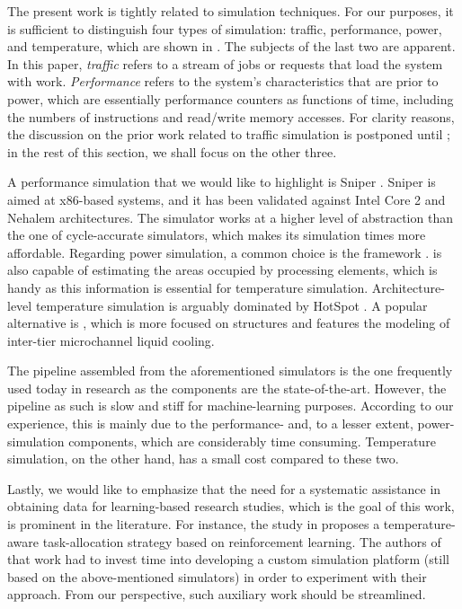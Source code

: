 The present work is tightly related to simulation techniques. For our purposes,
it is sufficient to distinguish four types of simulation: traffic, performance,
power, and temperature, which are shown in . The subjects of
the last two are apparent. In this paper, \emph{traffic} refers to a stream of
jobs or requests that load the system with work. \emph{Performance} refers to
the system's characteristics that are prior to power, which are essentially
performance counters as functions of time, including the numbers of instructions
and read/write memory accesses. For clarity reasons, the discussion on the prior
work related to traffic simulation is postponed until ; in the
rest of this section, we shall focus on the other three.

A performance simulation that we would like to highlight is Sniper
\cite{carlson2011}. Sniper is aimed at x86-based systems, and it has been
validated against Intel Core 2 and Nehalem architectures. The simulator works at
a higher level of abstraction than the one of cycle-accurate simulators, which
makes its simulation times more affordable. Regarding power simulation, a common
choice is the  framework \cite{li2009}.  is also capable of
estimating the areas occupied by processing elements, which is handy as this
information is essential for temperature simulation. Architecture-level
temperature simulation is arguably dominated by HotSpot \cite{skadron2004}. A
popular alternative is  \cite{sridhar2010}, which is more focused on
 structures and features the modeling of inter-tier microchannel liquid
cooling.

The pipeline assembled from the aforementioned simulators is the one frequently
used today in research as the components are the state-of-the-art. However, the
pipeline as such is slow and stiff for machine-learning purposes. According to
our experience, this is mainly due to the performance- and, to a lesser extent,
power-simulation components, which are considerably time consuming. Temperature
simulation, on the other hand, has a small cost compared to these two.

Lastly, we would like to emphasize that the need for a systematic assistance in
obtaining data for learning-based research studies, which is the goal of this
work, is prominent in the literature. For instance, the study in \cite{lu2015}
proposes a temperature-aware task-allocation strategy based on reinforcement
learning. The authors of that work had to invest time into developing a custom
simulation platform (still based on the above-mentioned simulators) in order to
experiment with their approach. From our perspective, such auxiliary work should
be streamlined.
